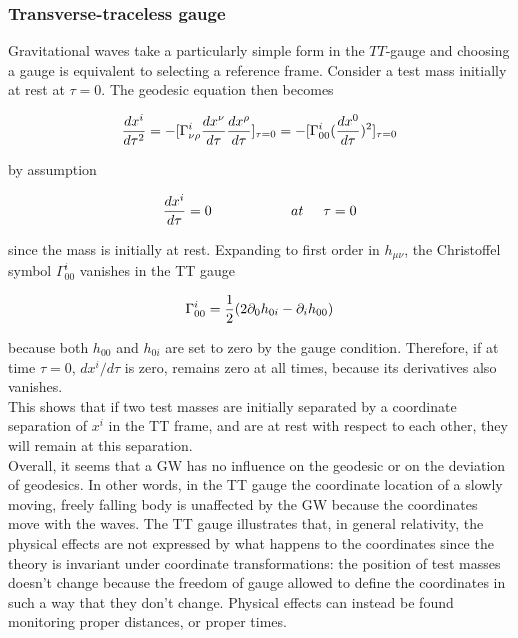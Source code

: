 \documentclass[binding=0.6cm, LaM]{sapthesis}
\begin{document}
\subsubsection{Transverse-traceless gauge}
	Gravitational waves take a particularly simple form in the $TT$-gauge 
	and choosing a gauge is equivalent to selecting a reference frame. 
	Consider a test mass initially at rest at $\tau = 0$. The geodesic equation then becomes

		\begin{equation}
		{{dx^i}\over{d\tau^2}} = -[\Gamma^i_{\nu\rho}{{dx^{\nu}}\over{d\tau}}{{dx^{\rho}}\over{d\tau}}]_{\tau=0} \\ 
		= - [ \Gamma^i_{00}({{dx^0}\over{d\tau}})^2]_{\tau=0}
		\end{equation}

	by assumption
		
		\begin{equation}
		{{dx^i}\over{d\tau}} = 0 \hspace*{2cm} at \hspace*{0.5cm}\tau = 0
		\end{equation}

	since the mass is initially at rest. Expanding to first order in $h_{\mu\nu}$, 
	the Christoffel symbol $\Gamma^i_{00}$ vanishes in the TT gauge

		\begin{equation}
		\Gamma^i_{00} = {1 \over {2}}(2\partial_{0}h_{0i} - \partial_i h_{00})
		\end{equation}

	because both $h_{00}$ and $h_{0i}$ are set to zero by the gauge condition. 
	Therefore, if at time $\tau = 0$, $dx^i/d\tau$ is zero, remains zero at all times, 
	because its derivatives also vanishes. \\
	This shows that if two test masses are initially separated by a coordinate separation of $x^i$ in the TT frame, 
	and are at rest with respect to each other, they will remain at this separation. \\
	Overall, it seems that a GW has no influence on the geodesic or on the deviation of geodesics.
	In other words, in the TT gauge the coordinate location of a slowly moving, freely falling body is unaffected 
	by the GW because the coordinates move with the waves.
	The TT gauge illustrates that, in general relativity, the physical effects are not expressed by what happens 
	to the coordinates since the theory is invariant under coordinate transformations:
	the position of test masses doesn't change because the freedom of gauge allowed to define the coordinates 
	in such a way that they don't change.
	Physical effects can instead be found monitoring proper distances, or proper times.
\end{document}
